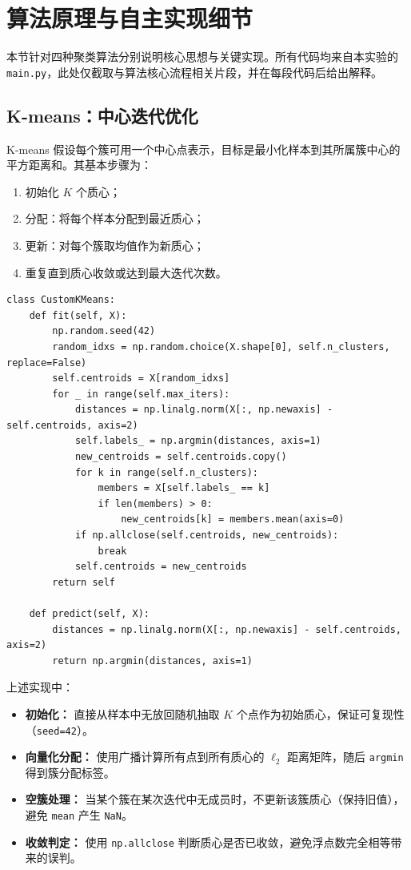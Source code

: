 \documentclass[runningheads]{ctexart}
\begin{document}
\section{算法原理与自主实现细节}
本节针对四种聚类算法分别说明核心思想与关键实现。所有代码均来自本实验的 \texttt{main.py}，此处仅截取与算法核心流程相关片段，并在每段代码后给出解释。

\subsection{K-means：中心迭代优化}
K-means 假设每个簇可用一个中心点表示，目标是最小化样本到其所属簇中心的平方距离和。其基本步骤为：
\begin{enumerate}
	\item 初始化 $K$ 个质心；
	\item 分配：将每个样本分配到最近质心；
	\item 更新：对每个簇取均值作为新质心；
	\item 重复直到质心收敛或达到最大迭代次数。
\end{enumerate}

\begin{lstlisting}
class CustomKMeans:
	def fit(self, X):
		np.random.seed(42)
		random_idxs = np.random.choice(X.shape[0], self.n_clusters, replace=False)
		self.centroids = X[random_idxs]
		for _ in range(self.max_iters):
			distances = np.linalg.norm(X[:, np.newaxis] - self.centroids, axis=2)
			self.labels_ = np.argmin(distances, axis=1)
			new_centroids = self.centroids.copy()
			for k in range(self.n_clusters):
				members = X[self.labels_ == k]
				if len(members) > 0:
					new_centroids[k] = members.mean(axis=0)
			if np.allclose(self.centroids, new_centroids):
				break
			self.centroids = new_centroids
		return self

	def predict(self, X):
		distances = np.linalg.norm(X[:, np.newaxis] - self.centroids, axis=2)
		return np.argmin(distances, axis=1)
\end{lstlisting}

上述实现中：
\begin{itemize}
	\item \textbf{初始化：} 直接从样本中无放回随机抽取 $K$ 个点作为初始质心，保证可复现性（\texttt{seed=42}）。
	\item \textbf{向量化分配：} 使用广播计算所有点到所有质心的 $\ell_2$ 距离矩阵，随后 \texttt{argmin} 得到簇分配标签。
	\item \textbf{空簇处理：} 当某个簇在某次迭代中无成员时，不更新该簇质心（保持旧值），避免 \texttt{mean} 产生 \texttt{NaN}。
	\item \textbf{收敛判定：} 使用 \texttt{np.allclose} 判断质心是否已收敛，避免浮点数完全相等带来的误判。
\end{itemize}
\end{document}

